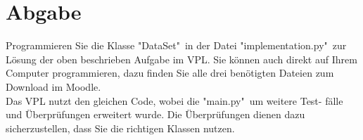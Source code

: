 \documentclass{article}
\begin{document}
\section{Abgabe}	
Programmieren Sie die Klasse "DataSet"\ in der Datei "implementation.py"\ zur
Lösung der oben beschrieben Aufgabe im VPL. Sie können auch direkt auf
Ihrem Computer programmieren, dazu finden Sie alle drei benötigten Dateien
zum Download im Moodle.\\[0.3cm]
Das VPL nutzt den gleichen Code, wobei die "main.py"\ um weitere Test-
fälle und Überprüfungen erweitert wurde. Die Überprüfungen dienen dazu
sicherzustellen, dass Sie die richtigen Klassen nutzen.
\end{document}
